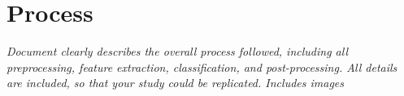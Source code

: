 \section{Process}
\textit{Document clearly describes the overall process followed, including all preprocessing, feature extraction, classification, and post-processing. All details are included, so that your study could be replicated. Includes images
}
%

%

%

